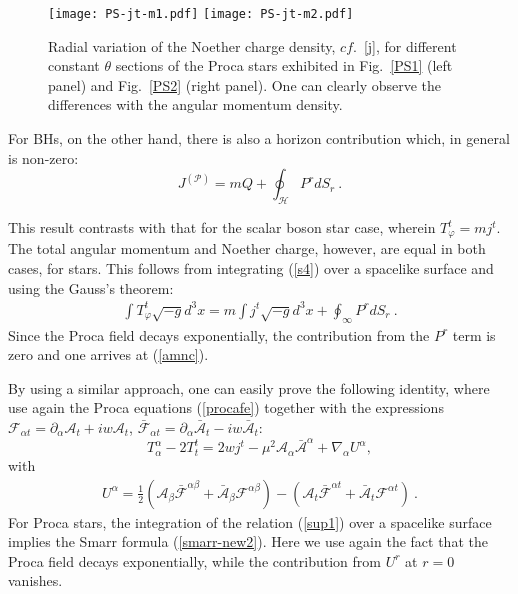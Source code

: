 \begin{figure}[h!]
  \begin{center}
    \texttt{[image: PS-jt-m1.pdf]}
      \texttt{[image: PS-jt-m2.pdf]}
  \end{center}
  \caption{Radial variation of the Noether charge density, $cf.$~\eqref{j}, for different constant $\theta$ sections of the Proca stars exhibited in Fig.~\ref{PS1} (left panel) and Fig.~\ref{PS2} (right panel). One can clearly observe the differences with the angular momentum density.}
  \label{fignc}
\end{figure}
%
For BHs, on the other hand, there is also a horizon contribution which, in general is non-zero:
\begin{equation}
J^{(\mathcal{P})}=mQ+ \oint_\mathcal{H}  P^r dS_r\ .
\label{JQBHs}
\end{equation}  


This result  contrasts with that for the scalar boson star case, wherein $T_\varphi^t =m j^t $. The total angular momentum and Noether charge, however, are equal in both cases, for stars. This follows from integrating (\ref{s4}) over a spacelike surface and using the Gauss's theorem:
\begin{eqnarray}
\label{s6}
\int T_\varphi^t \sqrt{-g} d^3 x =m \int j^t \sqrt{-g} d^3 x
+ \oint_\infty  P^r dS_r\ .
\end{eqnarray}
Since the Proca field decays exponentially, the contribution from the $P^r$ term 
is zero and one arrives at (\ref{amnc}).



By using a similar approach, one can easily prove the following identity, where use again the Proca equations (\ref{procafe}) together with
the expressions 
$ {\mathcal{F}}_{\alpha t} =\partial_\alpha {\mathcal{A}}_{t}+i w {\mathcal{A}}_{t}$,
$ \bar{\mathcal{F}}_{\alpha t} =\partial_\alpha \bar{\mathcal{A}}_{t}-i w \bar {\mathcal{A}}_{t}$:
 \begin{equation}
\label{sup1}
T^{\alpha}_\alpha-2T_t^t=
2w j^t - \mu^2 {\mathcal{A}}_\alpha \bar{\mathcal{A}}^\alpha+
\nabla_\alpha U^\alpha,
\end{equation} 
 with
\begin{eqnarray}
\label{sup2}
 U^\alpha=\frac{1}{2} 
\left(
{\mathcal{A}}_\beta \bar{ {\mathcal{F}}}^{\alpha \beta}+\bar{\mathcal{A}}_\beta { {\mathcal{F}}}^{\alpha \beta}
\right)
-\left({\mathcal{A}}_t \bar{ {\mathcal{F}}}^{\alpha t}+\bar{\mathcal{A}}_t { {\mathcal{F}}}^{\alpha t}
\right)  ~.
\end{eqnarray}
For Proca stars,
the integration of the relation (\ref{sup1}) 
over a spacelike surface 
implies the Smarr formula (\ref{smarr-new2}). Here we use again the fact that the Proca field decays exponentially, while the contribution from  $U^r$ at $r=0$ vanishes.

